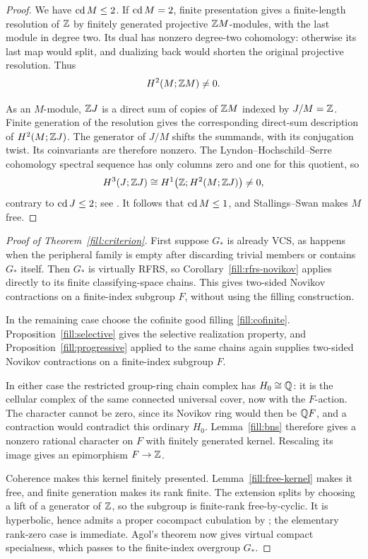 \begin{proof}
We have \(\operatorname{cd} M\le2\).  If \(\operatorname{cd} M=2\), finite presentation gives
a finite-length resolution of \(\mathbb Z\) by finitely generated
projective \(\mathbb Z M\)-modules, with the last module in degree two.
Its dual has nonzero degree-two cohomology:
otherwise its last map would split, and dualizing back would
shorten the original projective resolution.  Thus
\[
 H^2(M;\mathbb Z M)\ne0.
\]

As an \(M\)-module, \(\mathbb Z J\) is a direct sum of copies of \(\mathbb Z M\)
indexed by \(J/M=\mathbb Z\).  Finite generation of the resolution gives
the corresponding direct-sum description of \(H^2(M;\mathbb Z J)\).
The generator of \(J/M\) shifts the summands, with its conjugation
twist.  Its coinvariants are therefore nonzero.  The
Lyndon--Hochschild--Serre cohomology spectral sequence has only columns
zero and one for this quotient, so
\[
 H^3(J;\mathbb Z J)
 \cong H^1\bigl(\mathbb Z;H^2(M;\mathbb Z J)\bigr)\ne0,
\]
contrary to \(\operatorname{cd} J\le2\); see \cite{Brown1982,Bieri1976}.
It follows that \(\operatorname{cd} M\le1\), and Stallings--Swan
\cite{Stallings1968,Swan1969} makes \(M\) free.
\end{proof}

\begin{proof}[Proof of Theorem~\ref{fill:criterion}]
First suppose \(G_*\) is already VCS, as happens when the peripheral
family is empty after discarding trivial members or contains \(G_*\)
itself. Then \(G_*\) is virtually RFRS, so
Corollary~\ref{fill:rfrs-novikov} applies directly to its finite
classifying-space chains. This gives two-sided Novikov contractions
on a finite-index subgroup \(F\), without using the filling construction.

In the remaining case choose the cofinite good filling
\eqref{fill:cofinite}. Proposition~\ref{fill:selective} gives the
selective realization property, and Proposition~\ref{fill:progressive}
applied to the same chains again supplies two-sided Novikov
contractions on a finite-index subgroup \(F\).

In either case the restricted group-ring chain complex has
\(H_0\cong\mathbb Q\): it is the cellular complex of the same connected
universal cover, now with the \(F\)-action. The character cannot be
zero, since its Novikov ring would then be \(\mathbb Q F\), and a contraction
would contradict this ordinary \(H_0\). Lemma~\ref{fill:bns} therefore
gives a nonzero rational character on \(F\) with finitely generated
kernel. Rescaling its image gives an epimorphism \(F\to\mathbb Z\).

Coherence makes this kernel finitely presented.
Lemma~\ref{fill:free-kernel} makes it free, and finite generation
makes its rank finite.  The extension splits by choosing a lift
of a generator of \(\mathbb Z\), so the subgroup is finite-rank
free-by-cyclic.  It is hyperbolic, hence admits a proper cocompact
cubulation by \cite{HagenWise2016}; the elementary rank-zero case
is immediate.  Agol's theorem \cite{Agol2013} now gives virtual
compact specialness, which passes to the finite-index overgroup
\(G_*\).
\end{proof}
